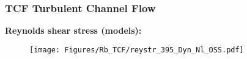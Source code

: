 \begin{frame}[t]
\frametitle{TCF {\small Turbulent Channel Flow}}
\textbf{Reynolds shear stress (models):}
  \vspace*{-0.3cm}
  \begin{figure}
    \centering	
    \texttt{[image: Figures/Rb\_TCF/reystr\_395\_Dyn\_Nl\_OSS.pdf]}
  \end{figure}
  \vspace*{-0.5cm}
  \begin{overlayarea}{\textwidth}{1.5cm}
  \end{overlayarea}
\end{frame}